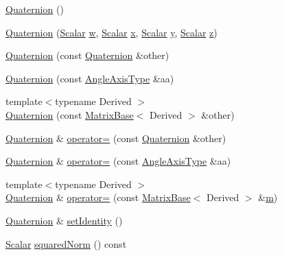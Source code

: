 \begin{DoxyCompactItemize}
\item 
\hyperlink{class_quaternion_a3eb59fb5f0174686b6d50795b4053a2d}{Quaternion} ()
\item 
\hyperlink{class_quaternion_a45e2c68aa528049d93491633986ade58}{Quaternion} (\hyperlink{class_rotation_base_ae9cbe0a3a87dfe2fa70958d9fe948a09}{Scalar} \hyperlink{glext_8h_ac1795f3b2fee217274b85c2750e1a889}{w}, \hyperlink{class_rotation_base_ae9cbe0a3a87dfe2fa70958d9fe948a09}{Scalar} \hyperlink{glext_8h_a1db9d104e3c2128177f26aff7b46982f}{x}, \hyperlink{class_rotation_base_ae9cbe0a3a87dfe2fa70958d9fe948a09}{Scalar} \hyperlink{glext_8h_a42315f3ed8fff752bb47fd782309fcfc}{y}, \hyperlink{class_rotation_base_ae9cbe0a3a87dfe2fa70958d9fe948a09}{Scalar} \hyperlink{glext_8h_a642c8d69fd1a54f255c898df4f0dd7ca}{z})
\item 
\hyperlink{class_quaternion_a12f965865b4ea7ee541bb60d94df690c}{Quaternion} (const \hyperlink{class_quaternion}{Quaternion} \&other)
\item 
\hyperlink{class_quaternion_a50363c51e8f12dcf2d0ac52029c01fbf}{Quaternion} (const \hyperlink{class_quaternion_a9669c6f15433959ede73917adff4ce53}{Angle\-Axis\-Type} \&aa)
\item 
{\footnotesize template$<$typename Derived $>$ }\\\hyperlink{class_quaternion_ad44ab95b0a69d0bc520b03610da1aa0c}{Quaternion} (const \hyperlink{class_matrix_base}{Matrix\-Base}$<$ Derived $>$ \&other)
\item 
\hyperlink{class_quaternion}{Quaternion} \& \hyperlink{class_quaternion_aaf3d54b762e7c7122812facbc1b0d7a3}{operator=} (const \hyperlink{class_quaternion}{Quaternion} \&other)
\item 
\hyperlink{class_quaternion}{Quaternion} \& \hyperlink{class_quaternion_a3d0cabe9261eacc4eb6c4bd442113655}{operator=} (const \hyperlink{class_quaternion_a9669c6f15433959ede73917adff4ce53}{Angle\-Axis\-Type} \&aa)
\item 
{\footnotesize template$<$typename Derived $>$ }\\\hyperlink{class_quaternion}{Quaternion} \& \hyperlink{class_quaternion_af8bc27b4d1382641e8fa0561792cc665}{operator=} (const \hyperlink{class_matrix_base}{Matrix\-Base}$<$ Derived $>$ \&\hyperlink{glext_8h_af593500c283bf1a787a6f947f503a5c2}{m})
\item 
\hyperlink{class_quaternion}{Quaternion} \& \hyperlink{class_quaternion_a4c9ec69d3a73f4b9f3daf550c9f52ff8}{set\-Identity} ()
\item 
\hyperlink{class_rotation_base_ae9cbe0a3a87dfe2fa70958d9fe948a09}{Scalar} \hyperlink{class_quaternion_a32e7a9dfba2bd87ea76296f79a31e684}{squared\-Norm} () const 

\end{DoxyCompactItemize}
